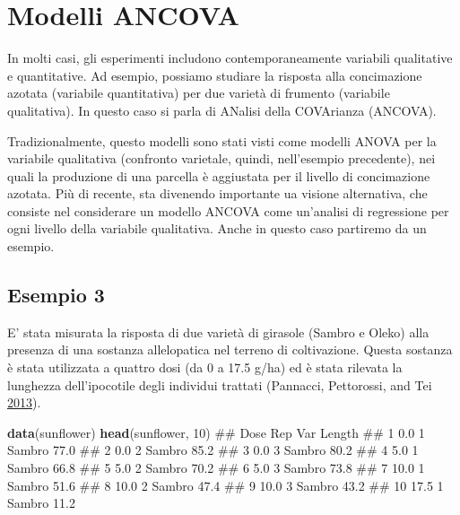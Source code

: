 \documentclass[a4paper,12pt,oneside]{book}
\newenvironment{Shaded}{\begin{snugshade}}{\end{snugshade}}
\newcommand{\KeywordTok}[1]{\textcolor[rgb]{0.13,0.29,0.53}{\textbf{#1}}}
\newcommand{\DecValTok}[1]{\textcolor[rgb]{0.00,0.00,0.81}{#1}}
\newcommand{\NormalTok}[1]{#1}
\theoremstyle{definition}
\theoremstyle{definition}
\theoremstyle{definition}
\theoremstyle{remark}
\begin{document}
\section{Modelli ANCOVA}\label{modelli-ancova}

In molti casi, gli esperimenti includono contemporaneamente variabili
qualitative e quantitative. Ad esempio, possiamo studiare la risposta
alla concimazione azotata (variabile quantitativa) per due varietà di
frumento (variabile qualitativa). In questo caso si parla di ANalisi
della COVArianza (ANCOVA).

Tradizionalmente, questo modelli sono stati visti come modelli ANOVA per
la variabile qualitativa (confronto varietale, quindi, nell'esempio
precedente), nei quali la produzione di una parcella è aggiustata per il
livello di concimazione azotata. Più di recente, sta divenendo
importante ua visione alternativa, che consiste nel considerare un
modello ANCOVA come un'analisi di regressione per ogni livello della
variabile qualitativa. Anche in questo caso partiremo da un esempio.

\subsection{Esempio 3}\label{esempio-3}

E' stata misurata la risposta di due varietà di girasole (Sambro e
Oleko) alla presenza di una sostanza allelopatica nel terreno di
coltivazione. Questa sostanza è stata utilizzata a quattro dosi (da 0 a
17.5 g/ha) ed è stata rilevata la lunghezza dell'ipocotile degli
individui trattati (Pannacci, Pettorossi, and Tei
\protect\hyperlink{ref-pannacci2013_Phytotoxiceffectsaqueous}{2013}).

\begin{Shaded}
\begin{Highlighting}[]
\KeywordTok{data}\NormalTok{(sunflower)}
\KeywordTok{head}\NormalTok{(sunflower, }\DecValTok{10}\NormalTok{)}
\NormalTok{##    Dose Rep     Var Length}
\NormalTok{## 1   0.0   1 Sambro    77.0}
\NormalTok{## 2   0.0   2 Sambro    85.2}
\NormalTok{## 3   0.0   3 Sambro    80.2}
\NormalTok{## 4   5.0   1 Sambro    66.8}
\NormalTok{## 5   5.0   2 Sambro    70.2}
\NormalTok{## 6   5.0   3 Sambro    73.8}
\NormalTok{## 7  10.0   1 Sambro    51.6}
\NormalTok{## 8  10.0   2 Sambro    47.4}
\NormalTok{## 9  10.0   3 Sambro    43.2}
\NormalTok{## 10 17.5   1 Sambro    11.2}
\end{Highlighting}
\end{Shaded}
\end{document}
